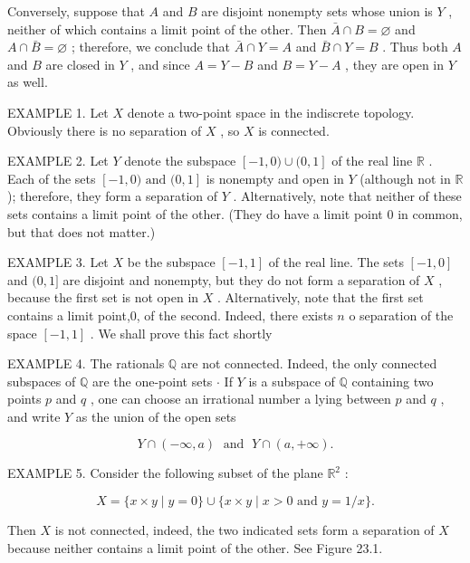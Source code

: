 Conversely, suppose that \(A\) and \(B\) are disjoint nonempty sets whose union is \(Y\) , neither of which contains a limit point of the other. Then \(\bar{A} \cap  B = \varnothing\) and \(A \cap  \bar{B} = \varnothing\) ; therefore, we conclude that \(\bar{A} \cap  Y = A\) and \(\bar{B} \cap  Y = B\) . Thus both \(A\) and \(B\) are closed in \(Y\) , and since \(A = Y - B\) and \(B = Y - A\) , they are open in \(Y\) as well.

EXAMPLE 1. Let \(X\) denote a two-point space in the indiscrete topology. Obviously there is no separation of \(X\) , so \(X\) is connected.

EXAMPLE 2. Let \(Y\) denote the subspace \(\left\lbrack  {-1,0)\cup (0,1}\right\rbrack\) of the real line \(\mathbb{R}\) . Each of the sets \(\left\lbrack  {-1,0)\text{ and }(0,1}\right\rbrack\) is nonempty and open in \(Y\) (although not in \(\mathbb{R}\) ); therefore, they form a separation of \(Y\) . Alternatively, note that neither of these sets contains a limit point of the other. (They do have a limit point 0 in common, but that does not matter.)

EXAMPLE 3. Let \(X\) be the subspace \(\left\lbrack  {-1,1}\right\rbrack\) of the real line. The sets \(\left\lbrack  {-1,0}\right\rbrack\) and \((0,1\rbrack\) are disjoint and nonempty, but they do not form a separation of \(X\) , because the first set is not open in \(X\) . Alternatively, note that the first set contains a limit point,0, of the second. Indeed, there exists \(n\) o separation of the space \(\left\lbrack  {-1,1}\right\rbrack\) . We shall prove this fact shortly

EXAMPLE 4. The rationals \(\mathbb{Q}\) are not connected. Indeed, the only connected subspaces of \(\mathbb{Q}\) are the one-point sets \(\cdot\) If \(Y\) is a subspace of \(\mathbb{Q}\) containing two points \(p\) and \(q\) , one can choose an irrational number a lying between \(p\) and \(q\) , and write \(Y\) as the union of the open sets

\[
Y \cap  \left( {-\infty ,a}\right) \;\text{ and }\;Y \cap  \left( {a, + \infty }\right) .
\]

EXAMPLE 5. Consider the following subset of the plane \({\mathbb{R}}^{2}\) :

\[
X = \{ x \times  y \mid  y = 0\}  \cup  \{ x \times  y \mid  x > 0\text{ and }y = 1/x\} .
\]

Then \(X\) is not connected, indeed, the two indicated sets form a separation of \(X\) because neither contains a limit point of the other. See Figure 23.1.

